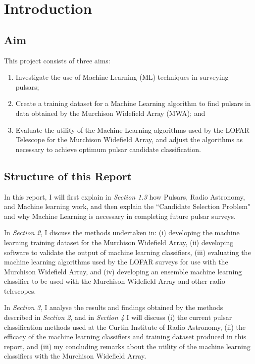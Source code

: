 \documentclass{article}
\begin{document}
\section{Introduction}

\subsection{Aim}

This project consists of three aims:
\begin{enumerate}[label=\roman*.]
    \item Investigate the use of Machine Learning (ML) techniques in surveying pulsars;
    \item Create a training dataset for a Machine Learning algorithm to find pulsars in data obtained by the Murchison Widefield Array (MWA); and
    \item Evaluate the utility of the Machine Learning algorithms used by the LOFAR Telescope for the Murchison Widefield Array, and adjust the algorithms as necessary to achieve optimum pulsar candidate classification.
\end{enumerate}

\subsection{Structure of this Report}

In this report, I will first explain in \emph{Section 1.3} how Pulsars, Radio Astronomy, and Machine learning work, and then explain the ``Candidate Selection Problem" \autocite{lyon} and why Machine Learning is necessary in completing future pulsar surveys.

In \emph{Section 2}, I discuss the methods undertaken in: (i) developing the machine learning training dataset for the Murchison Widefield Array, (ii) developing software to validate the output of machine learning classifiers, (iii) evaluating the machine learning algorithms used by the LOFAR surveys for use with the Murchison Widefield Array, and (iv) developing an ensemble machine learning classifier to be used with the Murchison Widefield Array and other radio telescopes.

In \emph{Section 3}, I analyse the results and findings obtained by the methods described in \emph{Section 2}, and in \emph{Section 4} I will discuss (i) the current pulsar classification methods used at the Curtin Institute of Radio Astronomy, (ii) the efficacy of the machine learning classifiers and training dataset produced in this report, and (iii) my concluding remarks about the utility of the machine learning classifiers with the Murchison Widefield Array.
\end{document}
